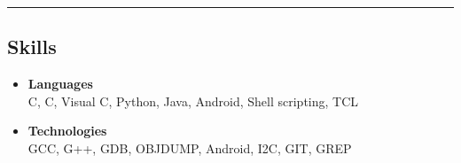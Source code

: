 \documentclass[10pt,letterpaper]{article}
\newcommand{\CPP}
{C\nolinebreak[4]\hspace{-.05em}\raisebox{.22ex}{\footnotesize\bf ++}}
\begin{document}
\hrule

\subsection*{Skills}
	\begin{itemize}
		\item 
		\textbf{Languages}\\
		 C, \CPP, Visual \CPP,  Python, Java, Android, Shell scripting, TCL
		\item
		\textbf{Technologies}\\
		GCC, G++, GDB, OBJDUMP, Android, I2C, GIT, GREP
	\end{itemize}
\end{document}
